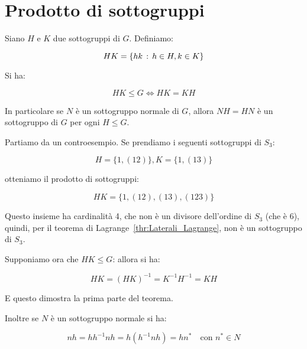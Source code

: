 \section{Prodotto di sottogruppi}

\begin{teorema}
	\label{thr:prodotto_sottogruppi}
	Siano $H$ e $K$ due sottogruppi di $G$. Definiamo:
	
	\begin{equation}
		HK = \{hk \,:\, h \in H, k \in K\}
	\end{equation}

	Si ha:

	\begin{equation}
		HK \le G \Longleftrightarrow HK = KH
	\end{equation}

	In particolare se $N$ è un sottogruppo normale di $G$, allora $NH = HN$ è un sottogruppo di $G$ per ogni $H \le G$.

\end{teorema}
\begin{dimostrazione}
	Partiamo da un controesempio. Se prendiamo i seguenti sottogruppi di $S_3$:
	
	\begin{equation}
		H = \{1, (12)\}, K = \{1, (13)\}
	\end{equation}
	
	otteniamo il prodotto di sottogruppi:
	
	\begin{equation*}
		HK = \{1, (12), (13), (123)\}
	\end{equation*}
	
	Questo insieme ha cardinalità 4, che non è un divisore dell'ordine di $S_3$ (che è 6), quindi,
	per il  teorema di Lagrange~\ref{thr:Laterali_Lagrange}, non è un sottogruppo di $S_3$.
	
	Supponiamo ora che $HK \le G$: allora si ha:
	
	\begin{equation*}
		HK = (HK)^{-1} = K^{-1}H^{-1} = KH
	\end{equation*}
	
	E questo dimostra la prima parte del teorema.
	
	Inoltre se $N$ è un sottogruppo normale si ha:
	
	\begin{equation*}
		nh = hh^{-1}nh = h(h^{-1}nh) = hn^* \quad \text{con } n^* \in N
	\end{equation*}
\end{dimostrazione}

